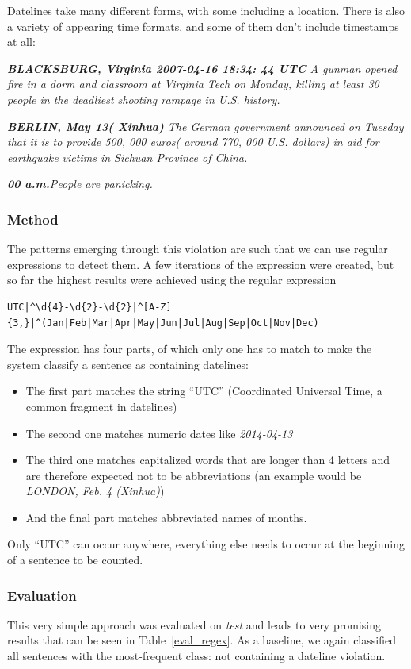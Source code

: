 \documentclass[a4paper,10pt]{scrartcl}
\theoremstyle{style}
\begin{document}
Datelines take many different forms, with some including a location. There is also a variety of appearing time formats, and some of them don't include timestamps at all:

\quad\textit{\textbf{BLACKSBURG, Virginia 2007-04-16 18:34: 44 UTC} A gunman opened fire in a dorm and classroom at Virginia Tech on Monday, killing at least 30 people in the deadliest shooting rampage in U.S. history.}

\quad\textit{\textbf{BERLIN, May 13( Xinhua)} The German government announced on Tuesday that it is to provide 500, 000 euros( around 770, 000 U.S. dollars) in aid for earthquake victims in Sichuan Province of China.}

\quad\textit{\textbf{00 a.m.}People are panicking.}

\subsubsection{Method}
The patterns emerging through this violation are such that we can use regular expressions to detect them. A few iterations of the expression were created, but so far the highest results were achieved using the regular expression

\begin{lstlisting}
UTC|^\d{4}-\d{2}-\d{2}|^[A-Z]{3,}|^(Jan|Feb|Mar|Apr|May|Jun|Jul|Aug|Sep|Oct|Nov|Dec)
\end{lstlisting}

The expression has four parts, of which only one has to match to make the system classify a sentence as containing datelines:

\begin{itemize}
\item The first part matches the string ``UTC'' (Coordinated Universal Time, a common fragment in datelines)
\item The second one matches numeric dates like \textit{2014-04-13}
\item The third one matches capitalized words that are longer than 4 letters and are therefore expected not to be abbreviations (an example would be \textit{LONDON, Feb. 4 (Xinhua)})
\item And the final part matches abbreviated names of months.
\end{itemize}

Only ``UTC'' can occur anywhere, everything else needs to occur at the beginning of a sentence to be counted.

\subsubsection{Evaluation}
This very simple approach was evaluated on \textit{test} and leads to very promising results that can be seen in Table~\ref{eval_regex}. As a baseline, we again classified all sentences with the most-frequent class: not containing a dateline violation.
\end{document}
